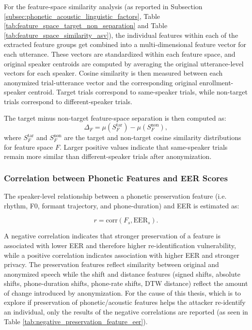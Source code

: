 \documentclass[12pt,leqno,a4paper]{article}
\begin{document}
For the feature-space similarity analysis (as reported in Subsection \ref{subsec:phonetic_acoustic_linguistic_factors}, 
Table \ref{tab:feature_space_target_non_separation} and Table \ref{tab:feature_space_similarity_asv}), the individual features within each of the extracted feature 
groups get combined into a multi-dimensional feature vector for each utterance. 
These vectors are standardized within each feature space, and original speaker centroids are computed by averaging the original utterance-level 
vectors for each speaker. Cosine similarity is then measured between each anonymized trial-utterance vector and the corresponding original 
enrollment-speaker centroid. Target trials correspond to same-speaker trials, while non-target trials correspond to different-speaker trials.

The target minus non-target feature-space separation is then computed as:
\begin{equation}
\Delta_F = \mu(S_F^{\mathrm{tar}}) - \mu(S_F^{\mathrm{non}}),
\end{equation}
where \(S_F^{\mathrm{tar}}\) and \(S_F^{\mathrm{non}}\) are the target and non-target cosine similarity distributions for feature space \(F\). Larger positive values indicate that same-speaker trials remain more similar than different-speaker trials after anonymization.


\subsubsection{Correlation between Phonetic Features and EER Scores}
\label{subsec:feature_eer_scores_correlation}

The speaker-level relationship between a phonetic preservation feature (i.e. rhythm, F0, formant trajectory, and phone-duration) and EER is 
estimated as:

\begin{equation}
r = \mathrm{corr}(F_s, \mathrm{EER}_s).
\end{equation}

A negative correlation indicates that stronger preservation of a feature is associated with lower EER and therefore higher 
re-identification vulnerability, while a positive correlation indicates association with higher EER and stronger privacy. 
The preservation features reflect similarity between original and anonymized speech while the shift and distance features 
(signed shifts, absolute shifts, phone-duration shifts, phone-rate shifts, DTW distance) reflect the amount of change introduced by anonymization. 
For the cause of this thesis, which is to explore if preservation of phonetic/acoustic features helps the attacker re-identify an individual, 
only the results of the negative correlations are reported (as seen in Table \ref{tab:negative_preservation_feature_eer}).
\end{document}
